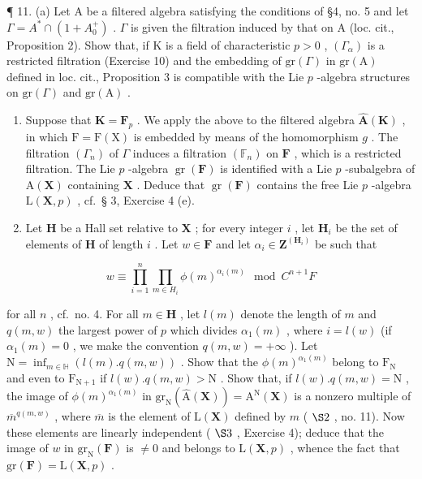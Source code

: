 ¶ 11. (a) Let A be a filtered algebra satisfying the conditions of §4, no. 5 and let \(\Gamma = A^{*} \cap (1 + A_{0}^{+})\) . \(\Gamma\) is given the filtration induced by that on A (loc. cit., Proposition 2). Show that, if K is a field of characteristic \(p > 0\) , \((\Gamma_{\alpha})\) is a restricted filtration (Exercise 10) and the embedding of \(\mathrm{gr}(\Gamma)\) in \(\mathrm{gr(A)}\) defined in loc. cit., Proposition 3 is compatible with the Lie \(p\) -algebra structures on \(\mathrm{gr}(\Gamma)\) and \(\mathrm{gr(A)}\) .

\begin{enumerate}
\def\labelenumi{(\alph{enumi})}
\setcounter{enumi}{1}
\item
  Suppose that \(\mathbf{K} = \mathbf{F}_p\) . We apply the above to the filtered algebra \(\hat{\mathbf{A}}(\mathbf{K})\) , in which \(\mathrm{F} = \mathrm{F}(\mathrm{X})\) is embedded by means of the homomorphism \(g\) . The filtration \((\Gamma_n)\) of \(\Gamma\) induces a filtration \((\mathbb{F}_n)\) on \(\mathbf{F}\) , which is a restricted filtration. The Lie \(p\) -algebra \(\operatorname{gr}(\mathbf{F})\) is identified with a Lie \(p\) -subalgebra of \(\mathrm{A}(\mathbf{X})\) containing \(\mathbf{X}\) . Deduce that \(\operatorname{gr}(\mathbf{F})\) contains the free Lie \(p\) -algebra \(\mathrm{L}(\mathbf{X}, p)\) , cf.~§ 3, Exercise 4 (e).
\item
  Let \(\mathbf{H}\) be a Hall set relative to \(\mathbf{X}\) ; for every integer \(i\) , let \(\mathbf{H}_i\) be the set of elements of \(\mathbf{H}\) of length \(i\) . Let \(w \in \mathbf{F}\) and let \(\alpha_i \in \mathbf{Z}^{(\mathbf{H}_i)}\) be such that
\end{enumerate}

\[
w \equiv \prod_ {i = 1} ^ {n} \prod_ {m \in H_i} \phi (m) ^ {\alpha_ {i} (m)} \mod C ^ {n + 1} F
\]

for all \(n\) , cf.~no. 4. For all \(m \in \mathbf{H}\) , let \(l(m)\) denote the length of \(m\) and \(q(m, w)\) the largest power of \(p\) which divides \(\alpha_{1}(m)\) , where \(i = l(w)\) (if \(\alpha_{1}(m) = 0\) , we make the convention \(q(m, w) = +\infty\) ). Let \(\mathrm{N} = \inf_{m \in \mathbb{H}} (l(m).q(m, w))\) . Show that the \(\phi(m)^{\alpha_{1}(m)}\) belong to \(\mathrm{F}_{\mathrm{N}}\) and even to \(\mathrm{F}_{\mathrm{N+1}}\) if \(l(w).q(m, w) > \mathrm{N}\) . Show that, if \(l(w).q(m, w) = \mathrm{N}\) , the image of \(\phi(m)^{\alpha_{1}(m)}\) in \(\mathrm{gr}_{\mathrm{N}}(\hat{\mathrm{A}}(\mathbf{X})) = \mathrm{A}^{\mathrm{N}}(\mathbf{X})\) is a nonzero multiple of \(\overline{m}^{q(m, w)}\) , where \(\overline{m}\) is the element of \(\mathrm{L}(\mathbf{X})\) defined by \(m\) ( \(\S 2\) , no. 11). Now these elements are linearly independent ( \(\S 3\) , Exercise 4); deduce that the image of \(w\) in \(\mathrm{gr}_{\mathrm{N}}(\mathbf{F})\) is \(\neq 0\) and belongs to \(\mathrm{L}(\mathbf{X}, p)\) , whence the fact that \(\mathrm{gr}(\mathbf{F}) = \mathrm{L}(\mathbf{X}, p)\) .

